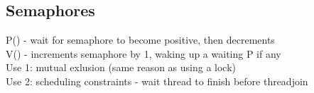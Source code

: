 \documentclass{article}
\begin{document}
\subsection{Semaphores}
P() - wait for semaphore to become positive, then decrements \\ 
V() - increments semaphore by 1, waking up a waiting P if any \\
Use 1: mutual exlusion (same reason as using a lock) \\ 
Use 2: scheduling constraints - wait thread to finish before threadjoin
\end{document}
